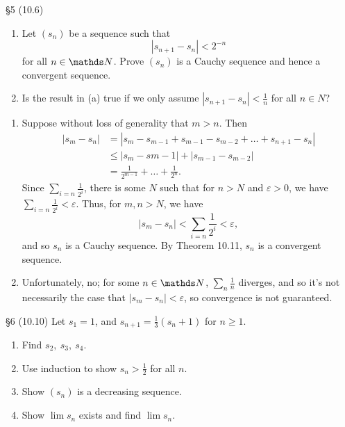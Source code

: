 \documentclass{homework}
\begin{document}
\begin{problem}{\S 5}
  (10.6)
  \begin{enumerate}[label=(\alph*)]
    \item Let $(s_n)$ be a sequence such that  \[
        \left| s_{n+1}-s_n \right| < 2^{-n}
      \] for all $n\in \N$. Prove $(s_n)$ is a Cauchy sequence and hence a convergent sequence.
    \item Is the result in (a) true if we only assume  $\left| s_{n+1}-s_n \right| <\frac{1}{n}$ for
      all $n\in N$?
  \end{enumerate}
\end{problem}

\begin{solution}
  \begin{enumerate}[label=(\alph*)]
    \item Suppose without loss of generality that $m>n$. Then
      \begin{align*}
        \left| s_m-s_n \right| &=\left| s_m -s_{m-1}+s_{m-1}-s_{m-2}+\ldots+s_{n+1}-s_n\right| \\
                               &\le \left| s_m-s{m-1} \right| +\left| s_{m-1}-s_{m-2} \right| \\
                               &= \frac{1}{2^{m-1}}+\ldots+\frac{1}{2^{n}}
      .\end{align*} Since $\sum_{i=n} \frac{1}{2^{i}}$, there is some $N$ such that for $n>N$ and 
      $\varepsilon>0$, we have $\sum_{i=n} \frac{1}{2^{i}}<\varepsilon$. Thus, for $m,n>N$, we have
      \[
        \left| s_m-s_n \right| <\sum_{i=n} \frac{1}{2^{i}}<\varepsilon
      ,\] and so $s_n$ is a Cauchy sequence. By Theorem 10.11, $s_n$ is a convergent sequence.

    \item Unfortunately, no; for some $n\in \N$, $\sum_{n} \frac{1}{n}$ diverges, and so it's not
      necessarily the case that $\left| s_m-s_n \right| <\varepsilon$, so convergence is not
      guaranteed.
  \end{enumerate}
\end{solution}

\begin{problem}{\S 6}
  (10.10) Let $s_1=1$, and $s_{n+1}=\frac{1}{3}(s_n+1)$ for $n\ge 1$.
  \begin{enumerate}[label=(\alph*)]
    \item Find $ s_2,\ s_3,\ s_4$.
    \item Use induction to show $s_n>\frac{1}{2}$ for all $n$.
    \item Show $(s_n)$ is a decreasing sequence.
    \item Show $\lim{s_n}$ exists and find $\lim{s_n}$.
  \end{enumerate}
\end{problem}
\end{document}
